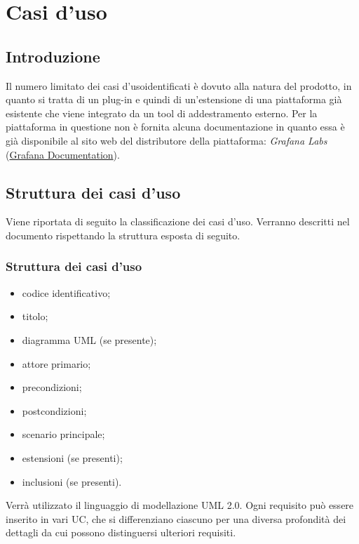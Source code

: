 \section{Casi d'uso}

	\subsection{Introduzione}
Il numero limitato dei casi d'uso\glo identificati è dovuto alla natura del prodotto, in quanto si tratta di un plug-in e quindi di un’estensione di una piattaforma già esistente che viene integrato da un tool di addestramento esterno.
Per la piattaforma in questione non è fornita alcuna documentazione in quanto essa è già disponibile al sito web del distributore della piattaforma: \emph{Grafana Labs} (\href{https://grafana.com/docs/grafana/latest/}{Grafana Documentation}).

	\subsection{Struttura dei casi d'uso}
Viene riportata di seguito la classificazione dei casi d’uso. Verranno descritti nel documento rispettando la struttura esposta di seguito.
	
		\subsubsection{Struttura dei casi d'uso}
		\begin{itemize}
			\item codice identificativo;
			\item titolo;
			\item diagramma UML (se presente);
			\item attore primario;
			\item precondizioni;
			\item postcondizioni;
			\item scenario principale;
			\item estensioni (se presenti);
			\item inclusioni (se presenti).
		\end{itemize}
Verrà utilizzato il linguaggio di modellazione UML 2.0\glo.
Ogni requisito può essere inserito in vari UC\glo, che si differenziano ciascuno per una diversa profondità dei dettagli da cui possono distinguersi ulteriori requisiti.

